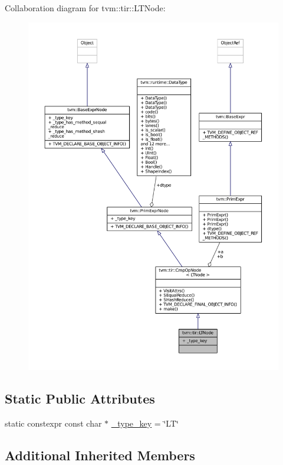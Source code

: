 Collaboration diagram for tvm\+:\+:tir\+:\+:L\+T\+Node\+:
\nopagebreak
\begin{figure}[H]
\begin{center}
\leavevmode
\includegraphics[width=350pt]{classtvm_1_1tir_1_1LTNode__coll__graph}
\end{center}
\end{figure}
\subsection*{Static Public Attributes}
\begin{DoxyCompactItemize}
\item 
static constexpr const char $\ast$ \hyperlink{classtvm_1_1tir_1_1LTNode_a9bdbb501e4868e67d07fd702e552475a}{\+\_\+type\+\_\+key} = \char`\"{}LT\char`\"{}
\end{DoxyCompactItemize}
\subsection*{Additional Inherited Members}


